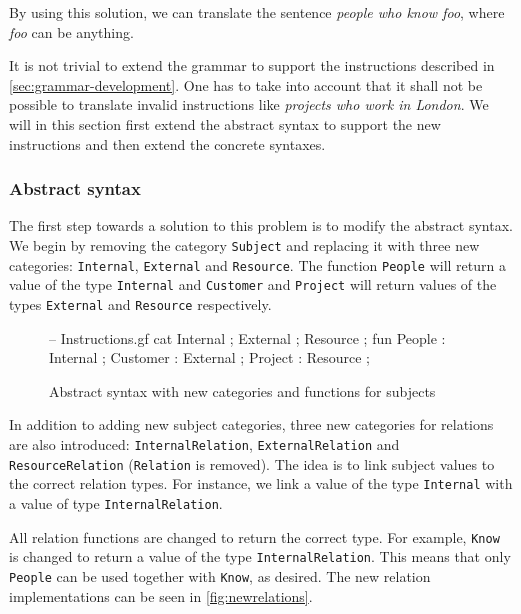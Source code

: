 By using this solution, we can translate the sentence \emph{people who know foo}, where \emph{foo} can be anything.

It is not trivial to extend the grammar to support the instructions described in \autoref{sec:grammar-development}. One has to take into account that it shall not be possible to translate invalid instructions like \emph{projects who work in London}. We will in this section first extend the abstract syntax to support the new instructions and then extend the concrete syntaxes.

\subsubsection*{Abstract syntax}

The first step towards a solution to this problem is to modify the abstract syntax. We begin by removing the category \texttt{Subject} and replacing it with three new categories: \texttt{Internal}, \texttt{External} and \texttt{Resource}. The function \texttt{People} will return a value of the type \texttt{Internal} and \texttt{Customer} and \texttt{Project} will return values of the types \texttt{External} and \texttt{Resource} respectively.

\begin{figure}[H]
\begin{code}
-- Instructions.gf
cat
  Internal ;
  External ;
  Resource ;
fun
  People   : Internal ;
  Customer : External ;
  Project  : Resource ;
\end{code}
\caption{Abstract syntax with new categories and functions for subjects}
\end{figure}

In addition to adding new subject categories, three new categories for relations are also introduced: \texttt{InternalRelation}, \texttt{ExternalRelation} and \texttt{ResourceRelation} (\texttt{Relation} is removed). The idea is to link subject values to the correct relation types. For instance, we link a value of the type \texttt{Internal} with a value of type \texttt{InternalRelation}.

All relation functions are changed to return the correct type. For example, \texttt{Know} is changed to return a value of the type \texttt{InternalRelation}. This means that only \texttt{People} can be used together with \texttt{Know}, as desired. The new relation implementations can be seen in \autoref{fig:newrelations}.

